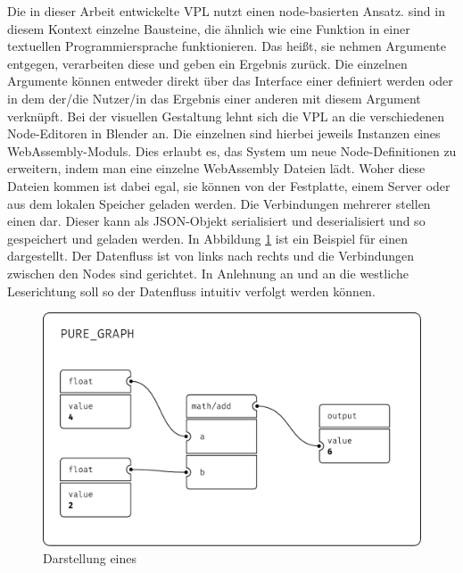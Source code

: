 \documentclass[ngerman]{article}
\begin{document}
Die in dieser Arbeit entwickelte VPL nutzt einen node-basierten Ansatz. 
 sind in diesem Kontext einzelne Bausteine, die ähnlich wie eine Funktion in einer textuellen Programmiersprache funktionieren.
Das heißt, sie nehmen Argumente entgegen, verarbeiten diese und geben ein Ergebnis zurück.
\br
Die einzelnen Argumente können entweder direkt über das Interface einer  definiert werden oder in dem der/die Nutzer/in das Ergebnis einer anderen  mit diesem Argument verknüpft.
Bei der visuellen Gestaltung lehnt sich die VPL an die verschiedenen Node-Editoren in Blender an.
\br
Die einzelnen  sind hierbei jeweils Instanzen eines WebAssembly-Moduls. 
Dies erlaubt es, das System um neue Node-Definitionen zu erweitern, indem man eine einzelne WebAssembly Dateien lädt.
Woher diese Dateien kommen ist dabei egal, sie können von der Festplatte, einem Server oder aus dem lokalen Speicher geladen werden.
\br
Die Verbindungen mehrerer  stellen einen  dar. 
Dieser  kann als JSON-Objekt serialisiert und deserialisiert und so gespeichert und geladen werden.
\br
In Abbildung \ref{sec:PURE_GRAPH} ist ein Beispiel für einen  dargestellt. 
Der Datenfluss ist von links nach rechts und die Verbindungen zwischen den Nodes sind gerichtet. In Anlehnung an  und an die westliche Leserichtung soll so der Datenfluss intuitiv verfolgt werden können.


\begin{figure}[htbp]
    \centering
    \begin{minipage}[b]{0.8\textwidth}
        \centering
        \includegraphics[width=\textwidth]{graphics/PURE_GRAPH.pdf}
        \caption{Darstellung eines }
        \label{sec:PURE_GRAPH}
    \end{minipage}
\end{figure}
\end{document}
